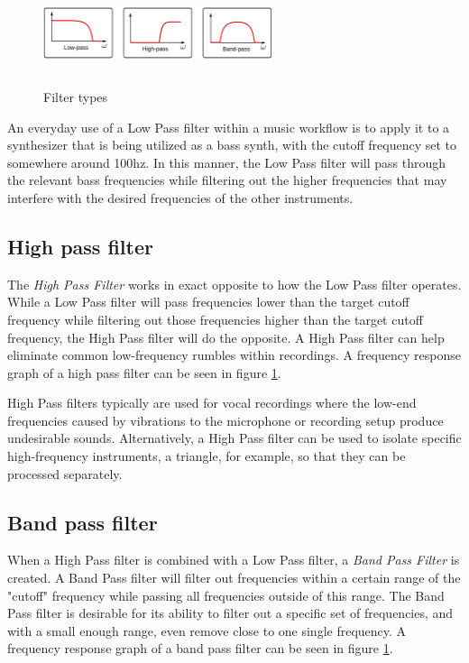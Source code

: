 \documentclass[a4paper,12pt]{report}
\begin{document}
\begin{figure}[h]
    \centering
    \includegraphics[width=0.6\textwidth,height=3cm]{FilterTypes.jpg}
    \caption{Filter types \cite{basicspassivercfilters}}
    \label{fig:FilterTypes}
\end{figure}

An everyday use of a Low Pass filter within a music workflow is to apply it to a synthesizer that is being utilized as a bass synth, with the cutoff frequency set to somewhere around 100hz. In this manner, the Low Pass filter will pass through the relevant bass frequencies while filtering out the higher frequencies that may interfere with the desired frequencies of the other instruments.

\subsection{High pass filter}
\label{subsec:highpassfilter}
The \emph{High Pass Filter} works in exact opposite to how the Low Pass filter operates. While a Low Pass filter will pass frequencies lower than the target cutoff frequency while filtering out those frequencies higher than the target cutoff frequency, the High Pass filter will do the opposite. A High Pass filter can help eliminate common low-frequency rumbles within recordings. A frequency response graph of a high pass filter can be seen in figure \ref{fig:FilterTypes}.

High Pass filters typically are used for vocal recordings where the low-end frequencies caused by vibrations to the microphone or recording setup produce undesirable sounds. Alternatively, a High Pass filter can be used to isolate specific high-frequency instruments, a triangle, for example, so that they can be processed separately.

\subsection{Band pass filter}
\label{subsec:bandpassfilter}
When a High Pass filter is combined with a Low Pass filter, a \emph{Band Pass Filter} is created. A Band Pass filter will filter out frequencies within a certain range of the "cutoff" frequency while passing all frequencies outside of this range. The Band Pass filter is desirable for its ability to filter out a specific set of frequencies, and with a small enough range, even remove close to one single frequency. A frequency response graph of a band pass filter can be seen in figure \ref{fig:FilterTypes}.
\end{document}
